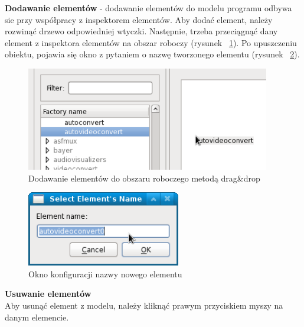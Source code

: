 \documentclass[12pt]{article}
\begin{document}
\begin{itemize}
  \setlength{\itemsep}{0em}

\begin{minipage}{0.4\textwidth}
\item 
\textbf{Dodawanie elementów} - dodawanie elementów do modelu programu odbywa sie przy współpracy z inspektorem elementów. Aby dodać element, należy rozwinąć drzewo odpowiedniej wtyczki. Następnie, trzeba przeciągnąć dany element z inspektora elementów na obszar roboczy (rysunek ~\ref{fig:dragDropElement}). Po upuszczeniu obiektu, pojawia się okno z pytaniem o nazwę tworzonego elementu (rysunek ~\ref{fig:nameForElementWindow}).
\end{minipage}
\hfill
\begin{minipage}{0.5\textwidth}\raggedleft
\begin{figure}[H]
  \includegraphics[width=0.95\textwidth]{img/drag-drop-element.png}
  \caption{Dodawanie elementów do obszaru roboczego metodą drag\&drop}
  \label{fig:dragDropElement}
\end{figure}
\begin{figure}[H]
  \includegraphics[width=0.6\textwidth]{img/name-for-element-window.png}
  \caption{Okno konfiguracji nazwy nowego elementu}
  \label{fig:nameForElementWindow}
\end{figure}
\end{minipage}
\vspace{5mm}
\item \textbf{Usuwanie elementów}\\ 
Aby usunąć element z modelu, należy kliknąć prawym przyciskiem myszy na danym elemencie.

\end{itemize}
\end{document}
